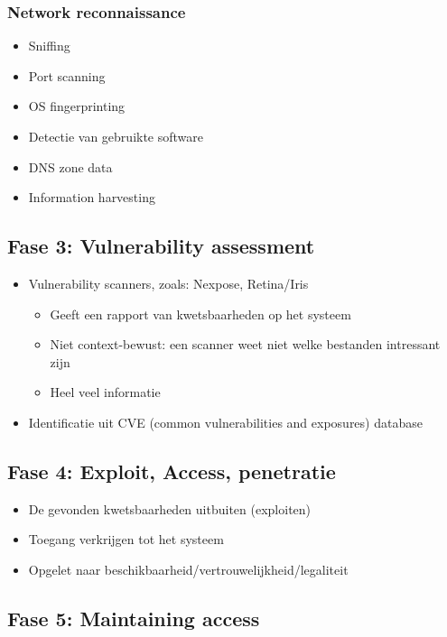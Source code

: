 \documentclass{article}
\begin{document}
\subsubsection{Network reconnaissance}

\begin{itemize}
    \item Sniffing
    \item Port scanning
    \item OS fingerprinting
    \item Detectie van gebruikte software
    \item DNS zone data
    \item Information harvesting
\end{itemize}

\subsection{Fase 3: Vulnerability assessment}

\begin{itemize}
    \item Vulnerability scanners, zoals: Nexpose, Retina/Iris
    \begin{itemize}
        \item Geeft een rapport van kwetsbaarheden op het systeem
        \item Niet context-bewust: een scanner weet niet welke bestanden intressant zijn
        \item Heel veel informatie
    \end{itemize}
    \item Identificatie uit CVE (common vulnerabilities and exposures) database
\end{itemize}

\subsection{Fase 4: Exploit, Access, penetratie}

\begin{itemize}
    \item De gevonden kwetsbaarheden uitbuiten (exploiten)
    \item Toegang verkrijgen tot het systeem
    \item Opgelet naar beschikbaarheid/vertrouwelijkheid/legaliteit
\end{itemize}


\subsection{Fase 5: Maintaining access}
\end{document}
